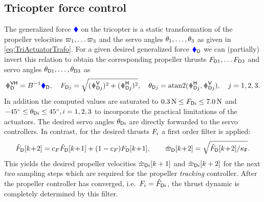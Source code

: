 \subsection{Tricopter force control}
The generalized force $\genForce$ on the tricopter is a static transformation of the propeller velocities $\PropVel[1], \ldots \PropVel[3]$ and the servo angles $\aServo[1],\ldots,\aServo[3]$ as given in \eqref{eq:TriActuatorTrafo}.
For a given desired generalized force $\genForceD$ we can (partially) invert this relation to obtain the corresponding propeller thrusts $\PropForceD[1], \ldots \PropForceD[3]$ and servo angles $\aServoD[1],\ldots,\aServoD[3]$ as
\begin{align}\label{eq:TriInvActuatorTrafo}
 \F_{\idxDes}^\mathsf{VH} = B^{-1} \genForceD,
\quad
 \PropForceD[j] = \sqrt{(\F_{\idxDes j}^\mathsf{V})^2 + (\F_{\idxDes j}^\mathsf{H})^2},
\quad
 \aServoD[j] = \atanTwo(\F_{\idxDes j}^\mathsf{H}, \F_{\idxDes j}^\mathsf{V}),
\quad j = 1,2,3.
\end{align}
In addition the computed values are saturated to $0.3\,\unit{N} \leq \PropForceD[i] \leq 7.0\,\unit{N}$ and $-45^\circ\leq \aServoD[i] \leq 45^\circ, i=1,2,3$ to incorporate the practical limitations of the actuators.
The desired servo angles $\aServoD[i]$ are directly forwarded to the servo controllers.
In contrast, for the desired thrusts $\PropForce[i]$ a first order filter is applied:
\begin{align}\label{eq:PropPrefilter}
 \PropForceDF[][k\!+\!2] = c_F \PropForceDF[][k\!+\!1] + (1-c_F) \PropForceD[][k\!+\!1],
\qquad
 \PropVelDF[][k\!+\!2] = \sqrt{\sfrac{\PropForceDF[][k\!+\!2]}{\kappaF}}.
\end{align}
This yields the desired propeller velocities $\PropVelDF[i][k+1]$ and $\PropVelDF[i][k+2]$ for the next \textit{two} sampling steps which are required for the propeller \textit{tracking} controller.
After the propeller controller has converged, i.e.\ $\PropForce[i] = \PropForceDF[i]$, the thrust dynamic is completely determined by this filter.

